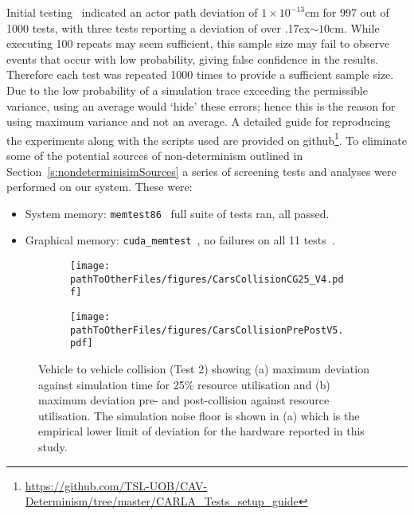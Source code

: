 Initial testing~\cite{TSLUnrealEngineTesting} indicated an actor path deviation of $1\times10^{-13}$cm for 997 out of 1000 tests, with three tests reporting a deviation of over {\raise.17ex\hbox{$\scriptstyle\sim$}}$10$cm. While executing 100 repeats may seem sufficient, this sample size may fail to observe events that occur with low probability, giving false confidence in the results. Therefore each test was repeated 1000 times to provide a sufficient sample size. 
%
Due to the low probability of a simulation trace exceeding the permissible variance, using an average would `hide' these errors; hence this is the reason for using maximum variance and not an average.
%
A detailed guide for reproducing the experiments along with the scripts used are provided on github\footnote{\url{https://github.com/TSL-UOB/CAV-Determinism/tree/master/CARLA_Tests_setup_guide}}. To eliminate some of the potential sources of non-determinism outlined in Section~\ref{s:nondeterminisimSources} a series of screening tests and analyses were performed on our system. These were:

\begin{itemize}[leftmargin=*]
    \item System memory: \texttt{memtest86}~\cite{MemTest86} full suite of tests ran, all passed.
    \item Graphical memory: \texttt{cuda\_memtest}~\cite{cuda_memtest}, no failures on all 11 tests~\cite{shi2009testing}.
\end{itemize}

\DIFdelbegin %

\DIFdelend \begin{figure*}[t]
    \centering
    \begin{subfigure}{.49\textwidth}
        \texttt{[image: \\pathToOtherFiles/figures/CarsCollisionCG25\_V4.pdf]}
        \caption{}
        \label{CarsCollisionCG25}
    \end{subfigure}
    \begin{subfigure}{.49\textwidth}
        \texttt{[image: \\pathToOtherFiles/figures/CarsCollisionPrePostV5.pdf]}
        \caption{}
        \label{CarsCollisionPrePost}
    \end{subfigure}
    \caption{Vehicle to vehicle collision (Test 2) showing (a) maximum deviation against simulation time for 25\% resource utilisation and (b) maximum deviation pre- and post-collision against resource utilisation. The simulation noise floor is shown in (a) which is the empirical lower limit of deviation for the hardware reported in this study.}
\end{figure*}

